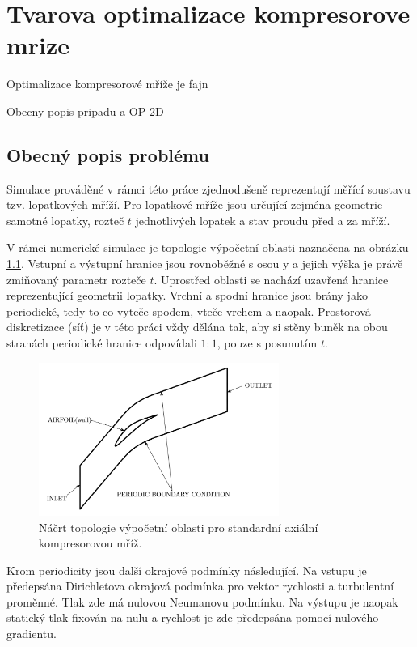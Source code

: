 

\chapter{Tvarova optimalizace kompresorove mrize}

Optimalizace kompresorové mříže je fajn

Obecny popis pripadu a OP
2D

\section{Obecný popis problému}

Simulace prováděné v rámci této práce zjednodušeně reprezentují měřící soustavu tzv. lopatkových mříží. Pro lopatkové mříže jsou určující zejména geometrie samotné lopatky, rozteč $ t $ jednotlivých lopatek a stav proudu před a za mříží.

V rámci numerické simulace je topologie výpočetní oblasti naznačena na obrázku \ref{fig:vypocetni_oblast}. Vstupní a výstupní hranice jsou rovnoběžné s osou y a jejich výška je právě zmiňovaný parametr rozteče $ t $. Uprostřed oblasti se nachází uzavřená hranice reprezentující geometrii lopatky. Vrchní a spodní hranice jsou brány jako periodické, tedy to co vyteče spodem, vteče vrchem a naopak. Prostorová diskretizace (síť) je v této práci vždy dělána tak, aby si stěny buněk na obou stranách periodické hranice odpovídali $ 1:1 $, pouze s posunutím $ t $.

\begin{figure}
	\includegraphics[width=0.7\textwidth]{img/ComputationalDomain.png}
	\caption{Náčrt topologie výpočetní oblasti pro standardní axiální kompresorovou mříž.}
	\label{fig:vypocetni_oblast}
\end{figure}

Krom periodicity jsou další okrajové podmínky následující. Na vstupu je předepsána Dirichletova okrajová podmínka pro vektor rychlosti a turbulentní proměnné. Tlak zde má nulovou Neumanovu podmínku. Na výstupu je naopak statický tlak fixován na nulu a rychlost je zde předepsána pomocí nulového gradientu.

